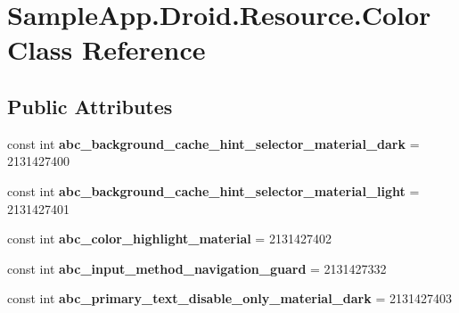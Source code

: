\hypertarget{class_sample_app_1_1_droid_1_1_resource_1_1_color}{}\section{Sample\+App.\+Droid.\+Resource.\+Color Class Reference}
\label{class_sample_app_1_1_droid_1_1_resource_1_1_color}
\subsection*{Public Attributes}
\begin{DoxyCompactItemize}
\item 
\mbox{\label{class_sample_app_1_1_droid_1_1_resource_1_1_color_a6ec358edf81f6dbc2c937b28e403415b}} 
const int {\bfseries abc\+\_\+background\+\_\+cache\+\_\+hint\+\_\+selector\+\_\+material\+\_\+dark} = 2131427400
\item 
\mbox{\label{class_sample_app_1_1_droid_1_1_resource_1_1_color_a4d93c1a3e48200a7404de2965d142ba3}} 
const int {\bfseries abc\+\_\+background\+\_\+cache\+\_\+hint\+\_\+selector\+\_\+material\+\_\+light} = 2131427401
\item 
\mbox{\label{class_sample_app_1_1_droid_1_1_resource_1_1_color_a553f5a9697f203094f2b4e06808b674d}} 
const int {\bfseries abc\+\_\+color\+\_\+highlight\+\_\+material} = 2131427402
\item 
\mbox{\label{class_sample_app_1_1_droid_1_1_resource_1_1_color_a293b486b510f7c04c67899b1445e76d9}} 
const int {\bfseries abc\+\_\+input\+\_\+method\+\_\+navigation\+\_\+guard} = 2131427332
\item 
\mbox{\label{class_sample_app_1_1_droid_1_1_resource_1_1_color_a07f2a9c7d9ebe0a8343b849ffdec39e1}} 
const int {\bfseries abc\+\_\+primary\+\_\+text\+\_\+disable\+\_\+only\+\_\+material\+\_\+dark} = 2131427403
\item 
\mbox{\label{class_sample_app_1_1_droid_1_1_resource_1_1_color_aa895b83e65a911bc82886e245bb1c333}} 

\end{DoxyCompactItemize}
